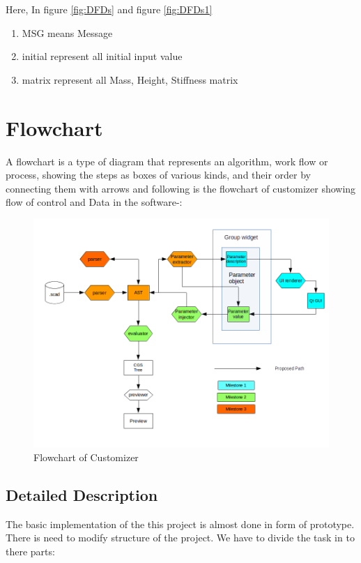Here, In figure \ref{fig:DFDs} and figure \ref{fig:DFDs1}
\begin{enumerate}
\item MSG means Message
\item initial represent all initial input value
\item matrix represent all Mass, Height, Stiffness matrix
\end{enumerate}

\section{Flowchart}
A flowchart is a type of diagram that represents an algorithm, work flow or process, showing the steps as boxes of various kinds, and their order by connecting them with arrows
and following is the flowchart of customizer showing flow of control and Data in the software-:

\begin{figure}
	\centering \includegraphics[scale=0.6]{images/flowchart.png}
	\caption{Flowchart of Customizer}
	\label{fig:FD1}
\end{figure}

\subsection{Detailed Description}

The basic implementation of the this project is almost done in form of prototype. There is need to modify structure of the project. We have to divide the task in to there parts:

